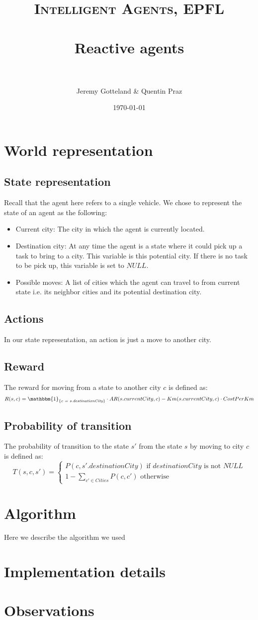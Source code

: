 \documentclass[fontsize=11pt]{scrartcl} %
\title{	
\normalfont \normalsize 
\textsc{Intelligent Agents, EPFL} \\ [20pt] %
\horrule{0.5pt} \\[0.4cm] %
\huge Reactive agents \\ %
\horrule{2pt} \\[0.5cm] %
}
\author{Jeremy Gotteland \& Quentin Praz} %
\date{\normalsize\today} %
\begin{document}
\maketitle %


\section*{World representation}
\subsection*{State representation}
Recall that the agent here refers to a single vehicle.
We chose to represent the state of an agent as the following:
\begin{itemize}
\item Current city: The city in which the agent is currently located.
\item Destination city: At any time the agent is a state where it could pick up a task to bring to a city. This variable is this potential city. If there is no task to be pick up, this variable is set to $NULL$.
\item Possible moves: A list of cities which the agent can travel to from current state i.e. its neighbor cities and its potential destination city.
\end{itemize}

\subsection*{Actions}
In our state representation, an action is just a move to another city.

\subsection*{Reward}
The reward for moving from a state to another city $c$ is defined as:
$$
R(s,c) = \mathbbm{1}_{ \{ \textit{c = s.destinationCity} \} } \cdot AR(s.currentCity, c) - Km(s.currentCity, c) \cdot CostPerKm
$$

\subsection*{Probability of transition}
The probability of transition to the state $s'$ from the state $s$ by moving to city $c$ is defined as:
$$
T(s,c,s') = 
\left\{
\begin{array}{l}
 P(c, s'.destinationCity) \text{ if $destinationCity$ is not $NULL$}\\
 1-\sum_{c' \in Cities} P(c,c') \text{ otherwise}
\end{array}
\right.
$$
\section*{Algorithm}
Here we describe the algorithm we used
\section*{Implementation details}


\section*{Observations}
\end{document}
